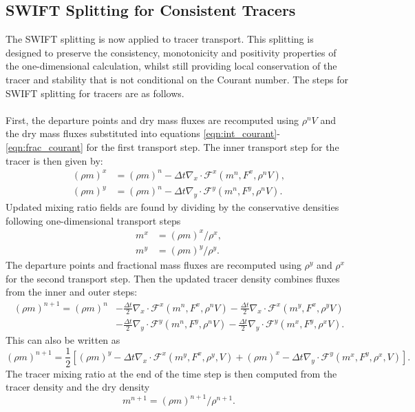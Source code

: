 \documentclass{ametsocV6.1}
\begin{document}
\subsection{SWIFT Splitting for Consistent Tracers} \label{sec:swift_tracer}
The SWIFT splitting is now applied to tracer transport.
This splitting is designed to preserve the consistency, monotonicity and positivity properties of the one-dimensional calculation, whilst still providing local conservation of the tracer and stability that is not conditional on the Courant number.
The steps for SWIFT splitting for tracers are as follows. \\
\\
First, the departure points and dry mass fluxes are recomputed using $\rho^nV$ and the dry mass fluxes substituted into equations \eqref{eqn:int_courant}-\eqref{eqn:frac_courant} for the first transport step.
The inner transport step for the tracer is then given by:
\begin{subequations}
\begin{align}  \label{eqn:swift_split_1}   
        (\rho m)^x &= (\rho m)^n - \Delta{t} \nabla_x\cdot \mathcal{F}^x(m^n,F^{x},\rho^nV), \\ \label{eqn:swift_split_2}
        (\rho m)^y &= (\rho m)^n - \Delta{t} \nabla_y\cdot \mathcal{F}^y(m^n,F^{y},\rho^nV).
\end{align}
\end{subequations}
Updated mixing ratio fields are found by dividing by the conservative densities following one-dimensional transport steps
\begin{subequations}
\begin{align}
m^x &= (\rho m)^x / \rho^x, \\
m^y &= (\rho m)^y / \rho^y.
\end{align}
\end{subequations}
The departure points and fractional mass fluxes are recomputed using $\rho^y$ and $\rho^x$ for the second transport step.
Then the updated tracer density combines fluxes from the inner and outer steps:
\begin{equation} \label{eqn:swift_tracer}
\begin{split}
(\rho m)^{n+1} = (\rho m)^n & -\frac{\Delta{t}}{2}\nabla_x\cdot \mathcal{F}^x(m^n,F^{x},\rho^nV) -\frac{\Delta{t}}{2}\nabla_x\cdot \mathcal{F}^x(m^y,F^{x},\rho^yV) \\
        & - \frac{\Delta{t}}{2}\nabla_y\cdot \mathcal{F}^y(m^n,F^{y},\rho^nV) -\frac{\Delta{t}}{2}\nabla_y\cdot \mathcal{F}^y(m^x,F^{y},\rho^xV).
\end{split}
\end{equation}
This can also be written as
\begin{equation}
(\rho m)^{n+1} = \frac{1}{2}\left[(\rho m)^y - \Delta t \nabla_x\cdot \mathcal{F}^x(m^y,F^{x},\rho^y, V) + (\rho m)^x - \Delta t \nabla_y\cdot \mathcal{F}^y(m^x,F^{y},\rho^x, V) \right].
\end{equation}
The tracer mixing ratio at the end of the time step is then computed from the tracer density and the dry density
\begin{equation}
    m^{n+1} = (\rho m)^{n+1} / \rho^{n+1}.
\end{equation}
\end{document}
